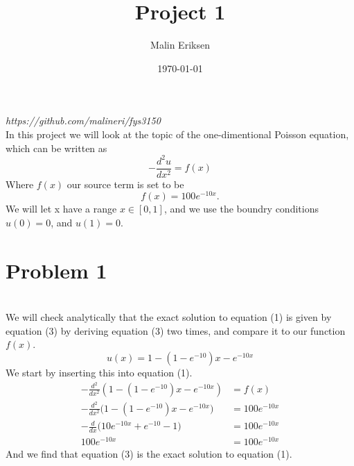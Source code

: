 \documentclass[english,notitlepage]{revtex4-1}  %
\begin{document}
\title{Project 1}      %
\author{Malin Eriksen}          %
\date{\today}                             %
\noaffiliation                            %


\maketitle

\textit{https://github.com/malineri/fys3150}\
\\
In this project we will look at the topic of the one-dimentional Poisson equation, which can be written as
 \begin{equation}
 -\frac{d^2 u}{dx^2} = f(x)
 \end{equation}
 Where $f(x)$ our source term is set to be
  \begin{equation}
 f(x) = 100e^{-10x}.
 \end{equation}
 We will let x have a range $x \in [0, 1]$, and we use the boundry conditions $u(0) = 0$, and $u(1) = 0$.

\section*{Problem 1}\
\\
We will check analytically that the exact solution to equation (1) is given by equation (3) by deriving equation (3) two times, and compare it to our function $f(x)$.
 \begin{equation}
u(x) = 1 - (1 - e^{-10})x - e^{-10x}
 \end{equation}
 We start by inserting this into equation (1).
  \begin{align*}
-\frac{d^2}{dx^2} (1 - (1 - e^{-10})x - e^{-10x} ) &= f(x) \\
-\frac{d^2}{dx^2} \bigg(1 - (1 - e^{-10})x - e^{-10x} \bigg) &= 100e^{-10x} \\
-\frac{d}{dx}  \bigg( 10e^{-10x} + e^{-10} - 1 \bigg) &= 100e^{-10x}\\
 100e^{-10x} &= 100e^{-10x}
 \end{align*}
 And we find that equation (3) is the exact solution to equation (1).
\end{document}
